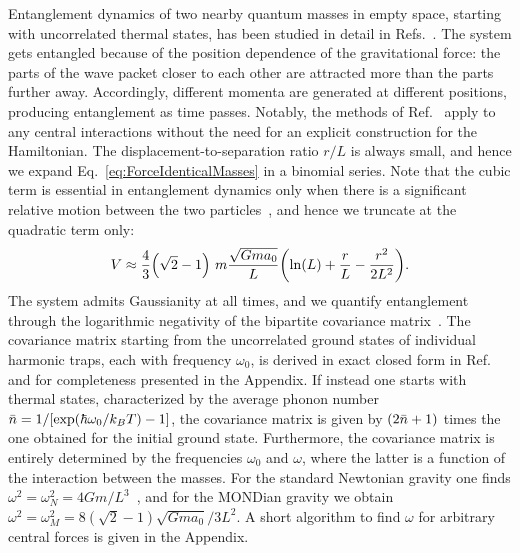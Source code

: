 \documentclass[aps,prl,reprint,superscriptaddress,nofootinbib,floatfix]{revtex4-2}
\begin{document}
Entanglement dynamics of two nearby quantum masses in empty space, starting with uncorrelated thermal states, has been studied in detail in  Refs.~\cite{QuantGrav-Tanjung2020,QuantGrav-MesEnt-Qvarfort2020,QuantGrav-Ankit2022}. The system gets entangled because of the position dependence of the gravitational force: the parts of the wave packet closer to each other are attracted more than the parts further away. Accordingly, different momenta are generated at different positions, producing entanglement as time passes.
Notably, the methods of Ref.~\cite{QuantGrav-Ankit2022} apply to any central interactions without the need for an explicit construction for the Hamiltonian.
The displacement-to-separation ratio $r/L$ is always small, and hence we expand Eq.~\eqref{eq:ForceIdenticalMasses} in a binomial series. Note that the cubic term is essential in entanglement dynamics only when there is a significant relative motion between the two particles~\cite{QuantGrav-Ankit2022}, and hence we truncate at the quadratic term only:
\begin{equation}
V  \approx  \frac{4}{3} \qty( \sqrt{2} - 1 ) \ m \frac{\sqrt{Gma_0}}{L} \qty( \ln(L) +  \frac{r}{L} - \frac{r^2}{2L^2} ) .
\end{equation}
The system admits Gaussianity at all times, and we quantify entanglement through the logarithmic negativity of the bipartite covariance matrix~\cite{PPTCrit-CV-Simon2000,Negativity-Gaussian-Adesso2005,Negativity-Vidal2002,Negativity-CV-Serafini2004}.
The covariance matrix starting from the uncorrelated ground states of individual harmonic traps, each with frequency $\omega_0$, is derived in exact closed form in Ref.~\cite{QuantGrav-Ankit2022} and for completeness presented in the Appendix.
If instead one starts with thermal states, characterized by the average phonon number $\bar{n} = 1/ \qty[\exp(\hbar\omega_0/k_BT)-1]$, the covariance matrix is given by $\qty(2\bar{n}+1)$ times the one obtained for the initial ground state.
Furthermore, the covariance matrix is entirely determined by the frequencies $ \omega_0 $ and $ \omega $, where the latter is a function of the interaction between the masses.
For the standard Newtonian gravity one finds $\omega^2 = \omega_N^2 = 4Gm/L^3$~\cite{QuantGrav-Ankit2022}, and for the MONDian gravity we obtain $\omega^2 = \omega_M^2 = 8(\sqrt{2}-1)\sqrt{Gma_0}/3L^2$.
A short algorithm to find $\omega$ for arbitrary central forces is given in the Appendix.
\end{document}
